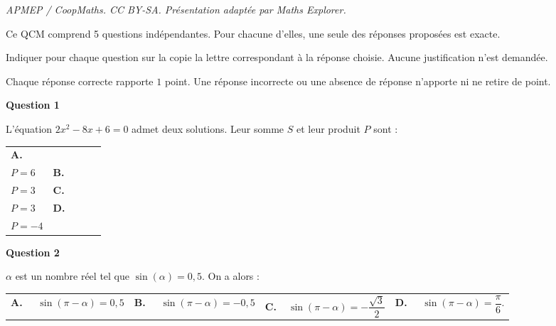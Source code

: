 \documentclass[10pt]{article}
\begin{document}
\noindent\textit{APMEP / CoopMaths. CC BY-SA. Présentation adaptée par Maths Explorer.}\par\medskip
\medskip

Ce QCM comprend 5 questions indépendantes. Pour chacune d'elles, une seule des réponses
proposées est exacte.

Indiquer pour chaque question sur la copie la lettre correspondant à la réponse choisie.
Aucune justification n'est demandée.

Chaque réponse correcte rapporte $1$ point. Une réponse incorrecte ou une absence de
réponse n'apporte ni ne retire de point.

\medskip
\textbf{Question 1}
\medskip 


L'équation $2x^2 - 8x + 6 = 0 $ admet deux solutions. Leur somme $S$ et leur produit $P$ sont :

\medskip

\begin{tabularx}{\linewidth}{*{4}{X}}
\textbf{A.~~} \begin{minipage}[t]{2cm}
$S = -8$\\
$P = 6$\end{minipage} &\textbf{B.~~} \begin{minipage}[t]{2cm}$S= -4$\\$P = 3$\end{minipage}&\textbf{C.~~}\begin{minipage}[t]{2cm}$S = 4$\\$P = 3$\end{minipage}& \textbf{D.~~} \begin{minipage}[t]{2cm}$S = 3$\\$P =-4$\end{minipage}.
\end{tabularx}

\medskip

\textbf{Question 2}

\medskip 

$\alpha$ est un nombre réel tel que $\sin(\alpha) = 0,5$. On a alors :

\medskip

\begin{tabularx}{\linewidth}{*{4}{X}}
\textbf{A.~~} $\sin(\pi-\alpha) = 0,5$ &\textbf{B.~~} $\sin(\pi-\alpha) = -0,5$&\textbf{C.~~}$\sin(\pi-\alpha) = -\dfrac{\sqrt{3}}{2}$& \textbf{D.~~} $\sin(\pi-\alpha) =\dfrac{\pi}{6}$.
\end{tabularx}

\medskip
\end{document}
